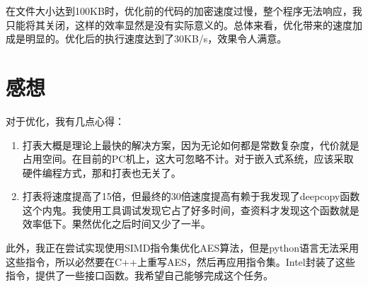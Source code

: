 \documentclass[11pt]{ctexart}
\begin{document}
在文件大小达到100KB时，优化前的代码的加密速度过慢，整个程序无法响应，我只能将其关闭，这样的效率显然是没有实际意义的。总体来看，优化带来的速度加成是明显的。优化后的执行速度达到了30KB/s，效果令人满意。
\section{感想}

对于优化，我有几点心得：
\begin{enumerate}[(1)]
    \item 打表大概是理论上最快的解决方案，因为无论如何都是常数复杂度，代价就是占用空间。在目前的PC机上，这大可忽略不计。对于嵌入式系统，应该采取硬件编程方式，那和打表也无关了。
    \item 打表将速度提高了15倍，但最终的30倍速度提高有赖于我发现了deepcopy函数这个内鬼。我使用工具调试发现它占了好多时间，查资料才发现这个函数就是效率低下。果然优化之后时间又少了一半。
\end{enumerate}
此外，我正在尝试实现使用SIMD指令集优化AES算法，但是python语言无法采用这些指令，所以必然要在C++上重写AES，然后再应用指令集。Intel封装了这些指令，提供了一些接口函数。我希望自己能够完成这个任务。
\end{document}
